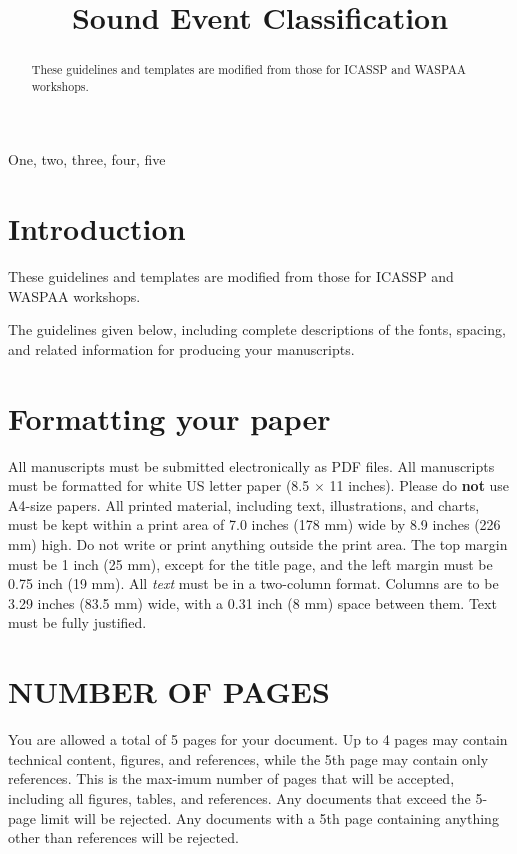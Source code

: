 \documentclass{article}
\title{Sound Event Classification}
\begin{document}
\ninept
\maketitle

\begin{sloppy}

\begin{abstract}
  These guidelines and templates are modified from those for 
  ICASSP and WASPAA workshops.
\end{abstract}

\begin{keywords}
One, two, three, four, five
\end{keywords}

\section{Introduction}
\label{sec:intro}

These guidelines and templates are modified from those for 
ICASSP and WASPAA \cite{waspaa21web} workshops.

The guidelines given below, including complete descriptions of 
the fonts, spacing, and related information for producing your manuscripts. 

\section{Formatting your paper}
\label{sec:format}

All manuscripts must be submitted electronically as PDF files. 
All manuscripts must be formatted for white US letter paper 
(8.5 $\times$ 11 inches). Please do {\bf not} use A4-size papers. 
All printed material, including text, illustrations, and charts, 
must be kept within a print area of 7.0 inches (178 mm) wide 
by 8.9 inches (226 mm) high. Do not write or print anything outside 
the print area. The top margin must be 1 inch (25 mm), except for 
the title page, and the left margin must be 0.75 inch (19 mm).  
All {\it text} must be in a two-column format. Columns are to be 
3.29 inches (83.5 mm) wide, with a 0.31 inch (8 mm) space between 
them. Text must be fully justified. 



\section{NUMBER OF PAGES}
\label{sec:pagelimit}

You are allowed a total of 5 pages for your document. Up to 4 pages may 
contain technical content, figures, and references, while the 5th page 
may contain only references. This is the max-imum number of pages that 
will be accepted, including all figures, tables, and references. Any 
documents that exceed the 5-page limit will be rejected. Any documents 
with a 5th page containing anything other than references will be rejected.



\end{sloppy}
\end{document}
